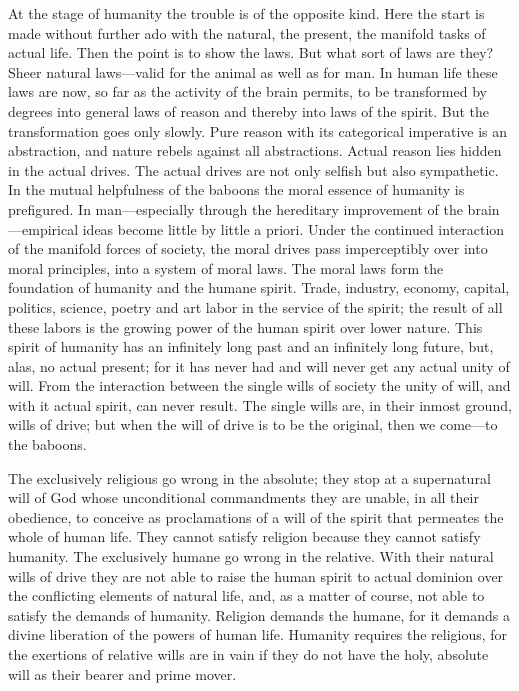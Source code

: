 \documentclass[12pt,a4paper,openany]{book}
\newcommand{\opage}[1]{\marginnote{\footnotesize\textit{[#1]}}}
\begin{document}
At the stage of humanity the trouble is of the opposite kind. Here the
start is made without further ado with the natural, the present, the
manifold tasks of actual life. Then the point is to show the laws. But
what sort of laws are they? Sheer natural laws---valid for the animal as
well as for man. In human life these laws are now, so far as the activity
of the brain permits, to be transformed by degrees into general laws of
reason and thereby into laws of the spirit. But the transformation goes
only slowly. Pure reason with its categorical imperative is an
abstraction, and nature rebels against all abstractions. Actual reason
lies hidden in the actual drives. The actual drives are not only selfish
but also sympathetic. In the mutual helpfulness of the baboons the moral
essence of humanity is prefigured. In man---especially through the
hereditary improvement of the brain---empirical ideas become little by
little a priori. Under the continued interaction of the manifold forces of
society, the moral drives pass imperceptibly over into moral \opage{103}principles,
into a system of moral laws. The moral laws form the foundation of
humanity and the humane spirit. Trade, industry, economy, capital,
politics, science, poetry and art labor in the service of the spirit; the
result of all these labors is the growing power of the human spirit over
lower nature. This spirit of humanity has an infinitely long past and an
infinitely long future, but, alas, no actual present; for it has never
had and will never get any actual unity of will. From the interaction
between the single wills of society the unity of will, and with it actual
spirit, can never result. The single wills are, in their inmost ground,
wills of drive; but when the will of drive is to be the original, then we
come---to the baboons.

The exclusively religious go wrong in the absolute; they stop at a
supernatural will of God whose unconditional commandments they are
unable, in all their obedience, to conceive as proclamations of a will of
the spirit that permeates the whole of human life. They cannot satisfy
religion because they cannot satisfy humanity. The exclusively humane go
wrong in the relative. With their natural wills of drive they are not
able to raise the human spirit to actual dominion over the conflicting
elements of natural life, and, as a matter of course, not able to satisfy
the demands of humanity. Religion demands the humane, for it demands a
divine liberation of the powers of human life. Humanity requires the
religious, for the exertions of relative wills are in vain if they do not
have the holy, absolute will as their bearer and prime mover.
\end{document}

